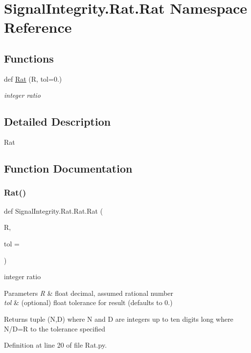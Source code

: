 \hypertarget{namespaceSignalIntegrity_1_1Rat_1_1Rat}{}\section{Signal\+Integrity.\+Rat.\+Rat Namespace Reference}
\label{namespaceSignalIntegrity_1_1Rat_1_1Rat}
\subsection*{Functions}
\begin{DoxyCompactItemize}
\item 
def \hyperlink{namespaceSignalIntegrity_1_1Rat_1_1Rat_acc3b9d0a67b9183c114fe38b1c48eb52}{Rat} (R, tol=0.)
\begin{DoxyCompactList}\small\item\em integer ratio \end{DoxyCompactList}\end{DoxyCompactItemize}


\subsection{Detailed Description}
\begin{DoxyVerb}Rat\end{DoxyVerb}
 

\subsection{Function Documentation}
\mbox{\label{namespaceSignalIntegrity_1_1Rat_1_1Rat_acc3b9d0a67b9183c114fe38b1c48eb52}} 
\subsubsection{\texorpdfstring{Rat()}{Rat()}}
{\footnotesize\ttfamily def Signal\+Integrity.\+Rat.\+Rat.\+Rat (\begin{DoxyParamCaption}\item[{}]{R,  }\item[{}]{tol = {} }\end{DoxyParamCaption})}



integer ratio 


\begin{DoxyParams}{Parameters}
{\em R} & float decimal, assumed rational number \\
\hline
{\em tol} & (optional) float tolerance for result (defaults to 0.) \\
\hline
\end{DoxyParams}
\begin{DoxyReturn}{Returns}
tuple (N,D) where N and D are integers up to ten digits long where N/D=R to the tolerance specified 
\end{DoxyReturn}


Definition at line 20 of file Rat.\+py.

